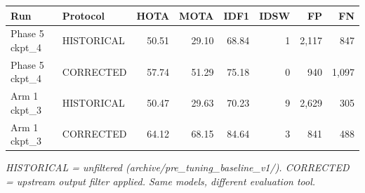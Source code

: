 \begin{table}[t]
\centering
\small
\begin{tabular}{llrrrrrr}
\toprule
Run & Protocol & HOTA & MOTA & IDF1 & IDSW & FP & FN \\
\midrule
Phase 5 ckpt\_4 & HISTORICAL & 50.51 & 29.10 & 68.84 & 1 & 2,117 & 847 \\
Phase 5 ckpt\_4 & CORRECTED & 57.74 & 51.29 & 75.18 & 0 & 940 & 1,097 \\
Arm 1 ckpt\_3 & HISTORICAL & 50.47 & 29.63 & 70.23 & 9 & 2,629 & 305 \\
Arm 1 ckpt\_3 & CORRECTED & 64.12 & 68.15 & 84.64 & 3 & 841 & 488 \\
\bottomrule
\end{tabular}
\par\smallskip\footnotesize\emph{HISTORICAL = unfiltered (archive/pre\_tuning\_baseline\_v1/). CORRECTED = upstream output filter applied. Same models, different evaluation tool.}
\end{table}

